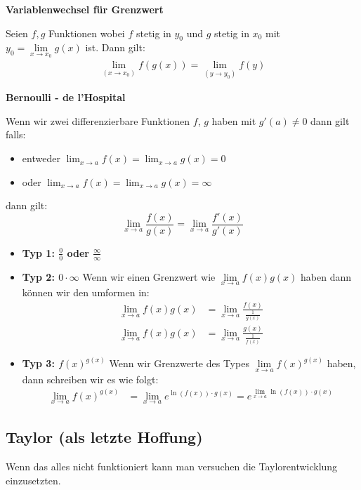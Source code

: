 \documentclass[25pt]{sciposter}
\newcommand{\limx}[1]{\lim\limits_{x \to #1}}
\newenvironment{method}[1]{\begin{mdframed}[backgroundcolor=blue!10,innertopmargin=15pt, innerbottommargin=15pt, nobreak=true]
		\textbf{#1 }
	}
	{ 
	\end{mdframed}
}
\begin{document}
\begin{multicols}{3}
\begin{method}{Variablenwechsel für Grenzwert}
	Seien $f,g$ Funktionen wobei $f$ stetig in $y_0$ und $g$ stetig in $x_0$ mit $y_0 = \lim\limits_{x \to x_0} g(x)$ ist. Dann gilt:
	\begin{align*}
		\lim_{(x\to x_0)}f(g(x)) = \lim_{(y\to y_0)} f(y)
	\end{align*}
\end{method}

\begin{method}{Bernoulli - de l’Hospital}
	Wenn wir zwei differenzierbare Funktionen $f$, $g$ haben mit $g'(a)\not = 0$ dann gilt falls:
	\begin{itemize}
		\item entweder $\lim_{x \to a} f(x) = \lim_{x \to a} g(x) = 0 $
		\item oder $\lim_{x \to a} f(x) = \lim_{x \to a} g(x) = \infty $
	\end{itemize}
	dann gilt:
	\begin{equation*}
	\lim_{x \to a} \frac{f(x)}{g(x)} = 	\lim_{x \to a} \frac{f'(x)}{g'(x)}
	\end{equation*}
\end{method}
\begin{itemize}
	\item \textbf{Typ 1: $\frac{0}{0}$ oder $\frac{\infty}{\infty}$}\\
	
	\item \textbf{Typ 2: $0 \cdot \infty$} Wenn wir einen Grenzwert wie $\lim\limits_{x \to a} f(x)g(x)$ haben dann können wir den umformen in:
	\begin{align*}
	\lim_{x \to a}f(x) g(x) &= \lim_{x\to a} \frac{f(x)}{\frac{1}{g(x)}}\\
	\lim_{x \to a}f(x) g(x) &= \lim_{x\to a} \frac{g(x)}{\frac{1}{f(x)}}
	\end{align*}

	
	
	\item \textbf{Typ 3: $f(x)^{g(x)}$} Wenn wir Grenzwerte des Types $ \limx{a} f(x)^{g(x)}$ haben, dann schreiben wir es wie folgt:
	\begin{align*}
	\limx{a} f(x)^{g(x)} &= \limx{a} e^{\ln(f(x))\cdot g(x)} = e^{\limx{a} \ln(f(x))\cdot g(x)}
	\end{align*}

\end{itemize}

\subsection*{Taylor (als letzte Hoffung)}
Wenn das alles nicht funktioniert kann man versuchen die Taylorentwicklung einzusetzten. \\


\end{multicols}
\end{document}
